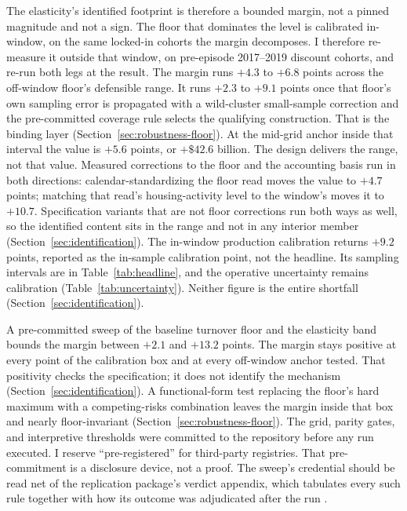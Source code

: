 \documentclass[12pt]{article}
\begin{document}
The elasticity's identified footprint is therefore a bounded margin, not a pinned magnitude and not a sign. The floor that dominates the level is calibrated in-window, on the same locked-in cohorts the margin decomposes. I therefore re-measure it outside that window, on pre-episode 2017--2019 discount cohorts, and re-run both legs at the result. The margin runs $+4.3$ to $+6.8$ points across the off-window floor's defensible range. It runs $+2.3$ to $+9.1$ points once that floor's own sampling error is propagated with a wild-cluster small-sample correction and the pre-committed coverage rule selects the qualifying construction. That is the binding layer (Section~\ref{sec:robustness-floor}). At the mid-grid anchor inside that interval the value is $+5.6$ points, or $+\$42.6$ billion. The design delivers the range, not that value. Measured corrections to the floor and the accounting basis run in both directions: calendar-standardizing the floor read moves the value to $+4.7$ points; matching that read's housing-activity level to the window's moves it to $+10.7$. Specification variants that are not floor corrections run both ways as well, so the identified content sits in the range and not in any interior member (Section~\ref{sec:identification}). The in-window production calibration returns $+9.2$ points, reported as the in-sample calibration point, not the headline. Its sampling intervals are in Table~\ref{tab:headline}, and the operative uncertainty remains calibration (Table~\ref{tab:uncertainty}). Neither figure is the entire shortfall (Section~\ref{sec:identification}).

A pre-committed sweep of the baseline turnover floor and the elasticity band bounds the margin between $+2.1$ and $+13.2$ points. The margin stays positive at every point of the calibration box and at every off-window anchor tested. That positivity checks the specification; it does not identify the mechanism (Section~\ref{sec:identification}). A functional-form test replacing the floor's hard maximum with a competing-risks combination leaves the margin inside that box and nearly floor-invariant (Section~\ref{sec:robustness-floor}). The grid, parity gates, and interpretive thresholds were committed to the repository before any run executed. I reserve ``pre-registered'' for third-party registries. That pre-commitment is a disclosure device, not a proof. The sweep's credential should be read net of the replication package's verdict appendix, which tabulates every such rule together with how its outcome was adjudicated after the run \citep{olken2015}.
\end{document}
